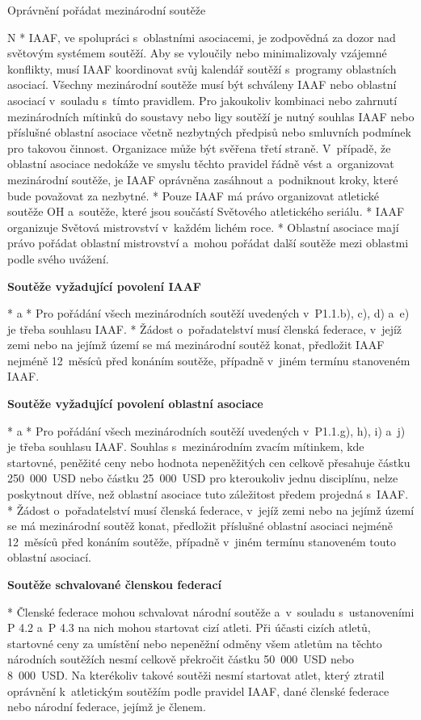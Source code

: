 \secc Oprávnění pořádat mezinárodní soutěže

\begitems \style N
* IAAF, ve spolupráci s~oblastními asociacemi, je zodpovědná za dozor nad světovým systémem soutěží. Aby se vyloučily nebo minimalizovaly vzájemné konflikty, musí IAAF koordinovat svůj kalendář soutěží s~programy oblastních asociací. Všechny mezinárodní soutěže musí být schváleny IAAF nebo oblastní asociací v~souladu s~tímto pravidlem. Pro jakoukoliv kombinaci nebo zahrnutí mezinárodních mítinků do soustavy nebo ligy soutěží je nutný souhlas IAAF nebo příslušné oblastní asociace včetně nezbytných předpisů nebo smluvních podmínek pro takovou činnost. Organizace může být svěřena třetí straně. V~případě, že oblastní asociace nedokáže ve smyslu těchto pravidel řádně vést a~organizovat mezinárodní soutěže, je IAAF oprávněna zasáhnout a~podniknout kroky, které bude považovat za nezbytné.
* Pouze IAAF má právo organizovat atletické soutěže OH a~soutěže, které jsou součástí Světového atletického seriálu.
* IAAF organizuje Světová mistrovství v~každém lichém roce.
* Oblastní asociace mají právo pořádat oblastní mistrovství a~mohou pořádat další soutěže mezi oblastmi podle svého uvážení.

{\bf Soutěže vyžadující povolení IAAF}

* \begitems \style a
  * Pro pořádání všech mezinárodních soutěží uvedených v~P1.1.b), c), d) a~e) je třeba souhlasu IAAF.
  * Žádost o~pořadatelství musí členská federace, v~jejíž zemi nebo na jejímž území se má mezinárodní soutěž konat, předložit IAAF nejméně 12~měsíců před konáním soutěže, případně v~jiném termínu stanoveném IAAF.
  \enditems

{\bf Soutěže vyžadující povolení oblastní asociace}

* \begitems \style a
  * Pro pořádání všech mezinárodních soutěží uvedených v~P1.1.g), h), i) a~j) je třeba souhlasu IAAF. Souhlas s~mezinárodním zvacím mítinkem, kde startovné, peněžité ceny nebo hodnota nepeněžitých cen celkově přesahuje částku 250~000~USD nebo částku 25~000~USD pro kteroukoliv jednu disciplínu, nelze poskytnout dříve, než oblastní asociace tuto záležitost předem projedná s~IAAF.
  * Žádost o~pořadatelství musí členská federace, v~jejíž zemi nebo na jejímž území se má mezinárodní soutěž konat, předložit příslušné oblastní asociaci nejméně 12~měsíců před konáním soutěže, případně v~jiném termínu stanoveném touto oblastní asociací.
  \enditems

{\bf Soutěže schvalované členskou federací}

* Členské federace mohou schvalovat národní soutěže a~v~souladu s~ustanoveními P 4.2 a~P 4.3 na nich mohou startovat cizí atleti. Při účasti cizích atletů, startovné ceny za umístění nebo nepeněžní odměny všem atletům na těchto národních soutěžích nesmí celkově překročit částku 50~000~USD nebo 8~000~USD. Na kterékoliv takové soutěži nesmí startovat atlet, který ztratil oprávnění k~atletickým soutěžím podle pravidel IAAF, dané členské federace nebo národní federace, jejímž je členem.
\enditems

